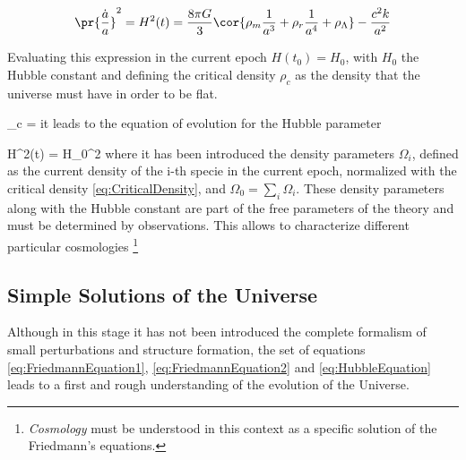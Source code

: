 \[ \pr{ \frac{\dot a}{a} }^2 = H^2(t) = \frac{ 8\pi G}{3}
\cor{ \rho_{m}\frac{1}{a^{3}} + \rho_{r}\frac{1}{a^{4}} + \rho_{\Lambda} }
- \frac{ c^2 k }{a^2} \]


Evaluating this expression in the current epoch $H(t_0) = H_0$, with $H_0$
the Hubble constant and defining the critical density $\rho_c$ as the 
density that the universe must have in order to be flat.


{ \rho_c =  }
it leads to the equation of evolution for the Hubble parameter


{ H^2(t) = H_0^2  }
where it has been introduced the density parameters $\Omega_i$, defined
as the current density of the i-th specie in the current epoch, normalized 
with the critical density \ref{eq:CriticalDensity}, and $\Omega_0 = 
\sum_i \Omega_i$. These density parameters along with the Hubble constant
are part of the free parameters of the theory and must be determined by 
observations. This allows to characterize different particular cosmologies
\footnote{\textit{Cosmology} must be understood in this context as a 
specific solution of the Friedmann's equations.}



	\subsection{Simple Solutions of the Universe}
	\label{subsec:SimpleSolutionsOfTheUniverse}


Although in this stage it has not been introduced the complete formalism 
of small perturbations and structure formation, the set of equations
\ref{eq:FriedmannEquation1}, \ref{eq:FriedmannEquation2} and 
\ref{eq:HubbleEquation} leads to a first and rough understanding of the
evolution of the Universe.



